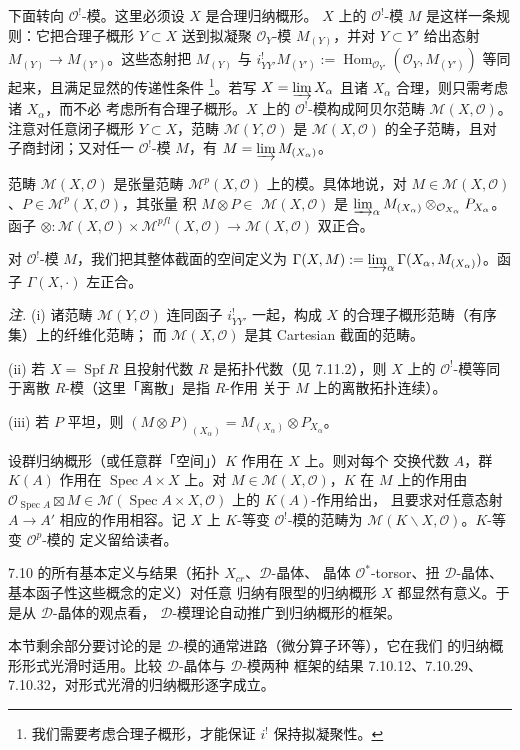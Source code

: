  下面转向 $\mathcal{O}^{!}$-模。这里必须设 $X$ 是合理归纳概形。
$X$ 上的 $\mathcal{O}^{!}$-模 $M$ 是这样一条规则：它把合理子概形 $Y\subset X$
送到拟凝聚 $\mathcal{O}_Y$-模 $M_{(Y)}$，并对 $Y\subset Y'$ 给出态射
$M_{(Y)}\to M_{(Y')}$。这些态射把 $M_{(Y)}$ 与
$i^{!}_{YY'}M_{(Y')}:=\operatorname{Hom}_{\mathcal{O}_{Y'}}
(\mathcal{O}_Y,M_{(Y')})$ 等同起来，且满足显然的传递性条件%
\footnote{我们需要考虑合理子概形，才能保证 $i^{!}$ 保持拟凝聚性。}。若写
$X=\varinjlim X_\alpha$ 且诸 $X_\alpha$ 合理，则只需考虑诸 $X_\alpha$，而不必
考虑所有合理子概形。$X$ 上的 $\mathcal{O}^{!}$-模构成阿贝尔范畴
$\mathcal{M}(X,\mathcal{O})$。注意对任意闭子概形 $Y\subset X$，范畴
$\mathcal{M}(Y,\mathcal{O})$ 是 $\mathcal{M}(X,\mathcal{O})$ 的全子范畴，且对
子商封闭；又对任一 $\mathcal{O}^{!}$-模 $M$，有
$M=\varinjlim M_{(X_\alpha)}$。

范畴 $\mathcal{M}(X,\mathcal{O})$ 是张量范畴
$\mathcal{M}^{p}(X,\mathcal{O})$ 上的模。具体地说，对
$M\in\mathcal{M}(X,\mathcal{O})$、$P\in\mathcal{M}^{p}(X,\mathcal{O})$，其张量
积 $M\otimes P\in$
$\mathcal{M}(X,\mathcal{O})$ 是
$\varinjlim_\alpha M_{(X_\alpha)}
\otimes_{\mathcal{O}_{X_\alpha}}P_{X_\alpha}$。函子
$\otimes:\mathcal{M}(X,\mathcal{O})\times
\mathcal{M}^{pfl}(X,\mathcal{O})\to\mathcal{M}(X,\mathcal{O})$ 双正合。

对 $\mathcal{O}^{!}$-模 $M$，我们把其整体截面的空间定义为
$\Gamma(X,M):=\varinjlim_\alpha\Gamma(X_\alpha,M_{(X_\alpha)})$。函子
$\Gamma(X,\cdot)$ 左正合。

\emph{注.} (i) 诸范畴 $\mathcal{M}(Y,\mathcal{O})$ 连同函子
$i^{!}_{YY'}$ 一起，构成 $X$ 的合理子概形范畴（有序集）上的纤维化范畴；
而 $\mathcal{M}(X,\mathcal{O})$ 是其 Cartesian 截面的范畴。

(ii) 若 $X=\operatorname{Spf}R$ 且投射代数 $R$ 是拓扑代数（见 7.11.2），则
$X$ 上的 $\mathcal{O}^{!}$-模等同于离散 $R$-模（这里「离散」是指 $R$-作用
关于 $M$ 上的离散拓扑连续）。

(iii) 若 $P$ 平坦，则
$(M\otimes P)_{(X_\alpha)}=M_{(X_\alpha)}\otimes P_{X_\alpha}$。

 设群归纳概形（或任意群「空间」）$K$ 作用在 $X$ 上。则对每个
交换代数 $A$，群 $K(A)$ 作用在 $\operatorname{Spec}A\times X$ 上。对
$M\in\mathcal{M}(X,\mathcal{O})$，$K$ 在 $M$ 上的作用由
$\mathcal{O}_{\operatorname{Spec}A}\boxtimes M\in
\mathcal{M}(\operatorname{Spec}A\times X,\mathcal{O})$ 上的 $K(A)$-作用给出，
且要求对任意态射 $A\to A'$ 相应的作用相容。记 $X$ 上 $K$-等变
$\mathcal{O}^{!}$-模的范畴为
$\mathcal{M}(K\backslash X,\mathcal{O})$。$K$-等变 $\mathcal{O}^{p}$-模的
定义留给读者。

 7.10 的所有基本定义与结果（拓扑 $X_{cr}$、$\mathcal{D}$-晶体、
晶体 $\mathcal{O}^*$-torsor、扭 $\mathcal{D}$-晶体、基本函子性这些概念的定义）对任意
归纳有限型的归纳概形 $X$ 都显然有意义。于是从 $\mathcal{D}$-晶体的观点看，
$\mathcal{D}$-模理论自动推广到归纳概形的框架。

本节剩余部分要讨论的是 $\mathcal{D}$-模的通常进路（微分算子环等），它在我们
的归纳概形形式光滑时适用。比较 $\mathcal{D}$-晶体与 $\mathcal{D}$-模两种
框架的结果 7.10.12、7.10.29、7.10.32，对形式光滑的归纳概形逐字成立。

